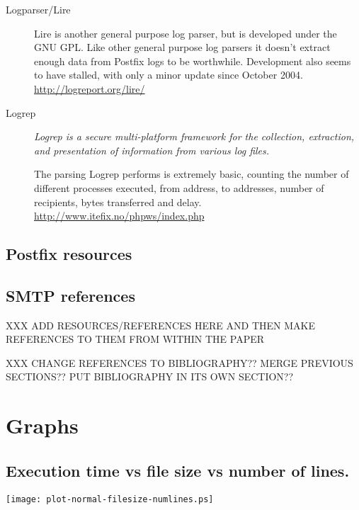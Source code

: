 \documentclass[a4paper,12pt,draft]{article}
\begin{document}
\begin{description}
    \item [Logparser/Lire] Lire is another general purpose log parser, but
        is developed under the GNU GPL\@.  Like other general purpose log
        parsers it doesn't extract enough data from Postfix logs to be
        worthwhile.  Development also seems to have stalled, with only a
        minor update since October 2004.  \newline
        \url{http://logreport.org/lire/}

    \item [Logrep] \textit{Logrep is a secure multi-platform framework for
        the collection, extraction, and presentation of information from
        various log files.\/}

        The parsing Logrep performs is extremely basic, counting the number
        of different processes executed, from address, to addresses, number
        of recipients, bytes transferred and delay.  \newline
        \url{http://www.itefix.no/phpws/index.php}

\end{description}

\subsection{Postfix resources}

\subsection{SMTP references}

XXX ADD RESOURCES/REFERENCES HERE AND THEN MAKE REFERENCES TO THEM FROM WITHIN THE PAPER

XXX CHANGE REFERENCES TO BIBLIOGRAPHY??  MERGE PREVIOUS SECTIONS??  PUT
BIBLIOGRAPHY IN ITS OWN SECTION??




\section{Graphs}

\subsection{Execution time vs file size vs number of lines.}
\label{execution time vs file size vs number lines}
\texttt{[image: plot-normal-filesize-numlines.ps]}
\end{document}
